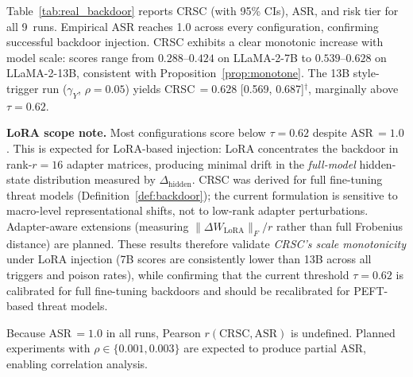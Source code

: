 Table~\ref{tab:real_backdoor} reports CRSC (with 95\% CIs), ASR,
and risk tier for all 9~runs.
Empirical ASR reaches 1.0 across every configuration, confirming
successful backdoor injection.
CRSC exhibits a clear monotonic increase with model scale:
scores range from $0.288$--$0.424$ on LLaMA-2-7B to
$0.539$--$0.628$ on LLaMA-2-13B, consistent with
Proposition~\ref{prop:monotone}.
The 13B style-trigger run ($\gamma_Y$, $\rho=0.05$) yields
CRSC\,$= 0.628$ [0.569, 0.687]$^\dagger$, marginally above $\tau=0.62$.

\textbf{LoRA scope note.}
Most configurations score below $\tau=0.62$ despite ASR\,$=1.0$.
This is expected for LoRA-based injection: LoRA concentrates the
backdoor in rank-$r=16$ adapter matrices, producing minimal drift
in the \emph{full-model} hidden-state distribution measured by
$\Delta_\text{hidden}$.
CRSC was derived for full fine-tuning threat models
(Definition~\ref{def:backdoor}); the current formulation is
sensitive to macro-level representational shifts, not to low-rank
adapter perturbations.
Adapter-aware extensions (measuring $\|\Delta W_\text{LoRA}\|_F / r$
rather than full Frobenius distance) are planned.
These results therefore validate \emph{CRSC's scale monotonicity}
under LoRA injection (7B scores are consistently lower than 13B
across all triggers and poison rates), while confirming that
the current threshold $\tau=0.62$ is calibrated for full fine-tuning
backdoors and should be recalibrated for PEFT-based threat models.

Because ASR\,$= 1.0$ in all runs, Pearson $r(\text{CRSC},\text{ASR})$
is undefined. Planned experiments with $\rho \in \{0.001, 0.003\}$ are
expected to produce partial ASR, enabling correlation analysis.


